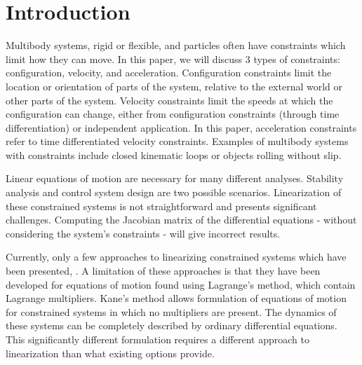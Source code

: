 \documentclass[smallcondensed]{svjour3}                     %
\begin{document}

\section{Introduction}
\label{sec:intro}
Multibody systems, rigid or flexible, and particles often have constraints
which limit how they can move. In this paper, we will discuss 3 types of
constraints: configuration, velocity, and acceleration. Configuration
constraints limit the location or orientation of parts of the system, relative
to the external world or other parts of the system. Velocity constraints limit
the speeds at which the configuration can change, either from configuration
constraints (through time differentiation) or independent application. In this
paper, acceleration constraints refer to time differentiated velocity
constraints. Examples of multibody systems with constraints include closed
kinematic loops or objects rolling without slip.

Linear equations of motion are necessary for many different analyses.
Stability analysis and control system design are two possible scenarios.
Linearization of these constrained systems is not straightforward and presents
significant challenges. Computing the Jacobian matrix of the differential
equations - without considering the system's constraints - will give incorrect
results.

Currently, only a few approaches to linearizing constrained systems which have
been presented\cite{Kang2003}, \cite{Negrut2006}. A limitation of these
approaches is that they have been developed for equations of motion found using
Lagrange's method, which contain Lagrange multipliers. Kane's method
\cite{Kane1985} allows formulation of equations of motion for constrained
systems in which no multipliers are present. The dynamics of these systems can
be completely described by ordinary differential equations. This significantly
different formulation requires a different approach to linearization than what
existing options provide.
\end{document}
